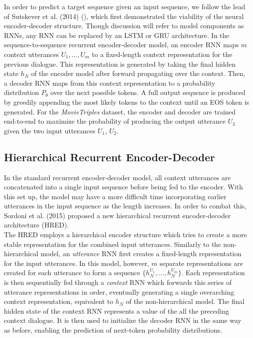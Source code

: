 \documentclass[11pt]{article}
\begin{document}
In order to predict a target sequence given an input sequence, we follow the lead of Sutskever et al. (2014) (\cite{sutskever}), which first demonstrated the viability of the neural encoder-decoder structure. Though discussion will refer to model components as RNNs, any RNN can be replaced by an LSTM or GRU architecture. In the sequence-to-sequence recurrent encoder-decoder model, an encoder RNN maps $m$ context utterances $U_1, \dots, U_m$ to a fixed-length context representation for the previous dialogue. This representation is generated by taking the final hidden state $h_{N}$ of the encoder model after forward propagating over the context. Then, a decoder RNN maps from this context representation to a probability distribution $P_\theta$ over the next possible tokens. A full output sequence is produced by greedily appending the most likely tokens to the context until an EOS token is generated. For the {\it MovieTriples} dataset, the encoder and decoder are trained end-to-end to maximize the probability of producing the output utterance $U_{3}$ given the two input utterances $U_{1}$, $U_{2}$.

\subsection{Hierarchical Recurrent Encoder-Decoder}

In the standard recurrent encoder-decoder model, all context utterances are concatenated into a single input sequence before being fed to the encoder. With this set up, the model may have a more difficult time incorporating earlier utterances in the input sequence as the length increases. In order to combat this, Sordoni et al. (2015) \cite{hred} proposed a new hierarchical recurrent encoder-decoder architecture (HRED). \\

\noindent The HRED employs a hierarchical encoder structure which tries to create a more stable representation for the combined input utterances. Similarly to the non-hierarchical model, an {\it utterance} RNN first creates a fixed-length representation for the input utterances. In this model, however, $m$ separate representations are created for each utterance to form a sequence $\{h^{U_1}_{N}, \dots, h^{U_m}_{N}\}$. Each representation is then sequentially fed through a {\it context} RNN which forwards this series of utterance representations in order, eventually generating a single overarching context representation, equivalent to $h_{N}$ of the non-hierarchical model. The final hidden state of the context RNN represents a value of the all the preceding context dialogue. It is then used to initialize the decoder RNN in the same way as before, enabling the prediction of next-token probability distributions. \\
\end{document}
